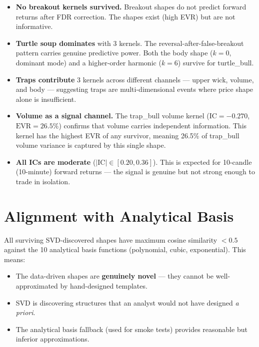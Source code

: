 \documentclass[11pt,a4paper]{article}
\begin{document}
\begin{itemize}
\item \textbf{No breakout kernels survived.}  Breakout shapes do not predict
      forward returns after FDR correction.  The shapes exist (high EVR) but
      are not informative.
\item \textbf{Turtle soup dominates} with 3 kernels.  The
      reversal-after-false-breakout pattern carries genuine predictive power.
      Both the body shape ($k{=}0$, dominant mode) and a higher-order harmonic
      ($k{=}6$) survive for turtle\_bull.
\item \textbf{Traps contribute} 3 kernels across different channels --- upper
      wick, volume, and body --- suggesting traps are multi-dimensional events
      where price shape alone is insufficient.
\item \textbf{Volume as a signal channel.}  The trap\_bull volume kernel
      ($\text{IC} = -0.270$, $\text{EVR} = 26.5\%$) confirms that volume
      carries independent information.  This kernel has the highest EVR of any
      survivor, meaning 26.5\% of trap\_bull volume variance is captured by
      this single shape.
\item \textbf{All ICs are moderate} ($|\text{IC}| \in [0.20, 0.36]$).  This is
      expected for 10-candle (10-minute) forward returns --- the signal is
      genuine but not strong enough to trade in isolation.
\end{itemize}

\section{Alignment with Analytical Basis}

All surviving SVD-discovered shapes have maximum cosine similarity $< 0.5$
against the 10 analytical basis functions (polynomial, cubic, exponential).
This means:

\begin{itemize}
\item The data-driven shapes are \textbf{genuinely novel} --- they cannot be
      well-approximated by hand-designed templates.
\item SVD is discovering structures that an analyst would not have designed
      \textit{a priori}.
\item The analytical basis fallback (used for smoke tests) provides reasonable
      but inferior approximations.
\end{itemize}
\end{document}
